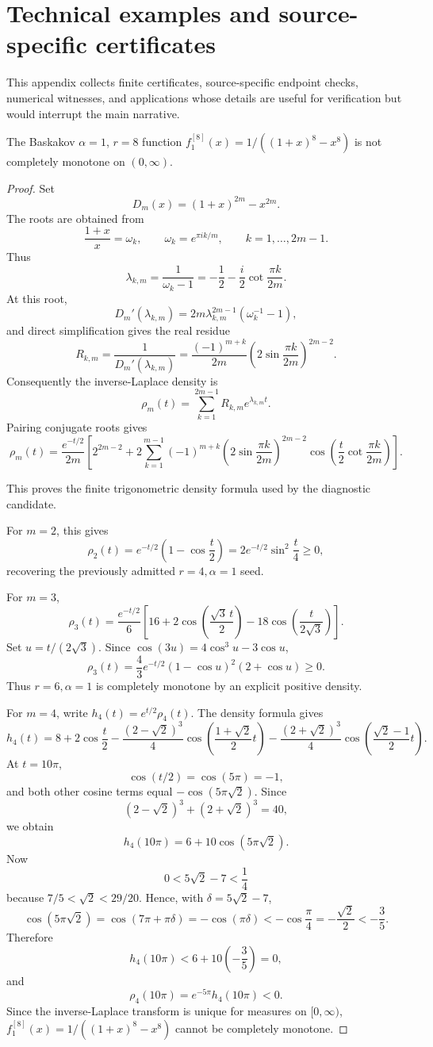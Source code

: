 \section{Technical examples and source-specific certificates}
This appendix collects finite certificates, source-specific endpoint checks, numerical witnesses, and applications whose details are useful for verification but would interrupt the main narrative.
\begin{counterexample}
\label{res:baskakov-alpha1-r8-not-cm}
The Baskakov \(\alpha=1\), \(r=8\) function \(f^{[8]}_1(x)=1/((1+x)^8-x^8)\) is not completely monotone on \((0,\infty)\).
\end{counterexample}
\begin{proof}
Set
\[
D_m(x)=(1+x)^{2m}-x^{2m}.
\]
The roots are obtained from
\[
\frac{1+x}{x}=\omega_k,\qquad
\omega_k=e^{\pi i k/m},\qquad k=1,\ldots,2m-1.
\]
Thus
\[
\lambda_{k,m}
=\frac{1}{\omega_k-1}
=-\frac12-\frac{i}{2}\cot\frac{\pi k}{2m}.
\]
At this root,
\[
D_m'(\lambda_{k,m})
=2m\lambda_{k,m}^{2m-1}(\omega_k^{-1}-1),
\]
and direct simplification gives the real residue
\[
R_{k,m}
=\frac{1}{D_m'(\lambda_{k,m})}
=\frac{(-1)^{m+k}}{2m}
\left(2\sin\frac{\pi k}{2m}\right)^{2m-2}.
\]
Consequently the inverse-Laplace density is
\[
\rho_m(t)
=\sum_{k=1}^{2m-1}R_{k,m}e^{\lambda_{k,m}t}.
\]
Pairing conjugate roots gives
\[
\rho_m(t)
=\frac{e^{-t/2}}{2m}
\left[
2^{2m-2}
+2\sum_{k=1}^{m-1}
(-1)^{m+k}
\left(2\sin\frac{\pi k}{2m}\right)^{2m-2}
\cos\!\left(
\frac{t}{2}\cot\frac{\pi k}{2m}
\right)
\right].
\]

This proves the finite trigonometric density formula used by the diagnostic
candidate.

For \(m=2\), this gives
\[
\rho_2(t)=e^{-t/2}\left(1-\cos\frac t2\right)
=2e^{-t/2}\sin^2\frac t4\ge0,
\]
recovering the previously admitted \(r=4,\alpha=1\) seed.

For \(m=3\),
\[
\rho_3(t)
=\frac{e^{-t/2}}6
\left[
16+2\cos\left(\frac{\sqrt3\,t}{2}\right)
-18\cos\left(\frac{t}{2\sqrt3}\right)
\right].
\]
Set \(u=t/(2\sqrt3)\).  Since
\(\cos(3u)=4\cos^3u-3\cos u\),
\[
\rho_3(t)
=\frac{4}{3}e^{-t/2}(1-\cos u)^2(2+\cos u)\ge0.
\]
Thus \(r=6,\alpha=1\) is completely monotone by an explicit positive density.

For \(m=4\), write \(h_4(t)=e^{t/2}\rho_4(t)\).  The density formula gives
\[
h_4(t)
=8+2\cos\frac t2
-\frac{(2-\sqrt2)^3}{4}
\cos\left(\frac{1+\sqrt2}{2}t\right)
-\frac{(2+\sqrt2)^3}{4}
\cos\left(\frac{\sqrt2-1}{2}t\right).
\]
At \(t=10\pi\),
\[
\cos(t/2)=\cos(5\pi)=-1,
\]
and both other cosine terms equal \(-\cos(5\pi\sqrt2)\).  Since
\[
(2-\sqrt2)^3+(2+\sqrt2)^3=40,
\]
we obtain
\[
h_4(10\pi)=6+10\cos(5\pi\sqrt2).
\]
Now
\[
0<5\sqrt2-7<\frac14
\]
because \(7/5<\sqrt2<29/20\).  Hence, with
\(\delta=5\sqrt2-7\),
\[
\cos(5\pi\sqrt2)=\cos(7\pi+\pi\delta)=-\cos(\pi\delta)
<-\cos\frac\pi4=-\frac{\sqrt2}{2}<-\frac35.
\]
Therefore
\[
h_4(10\pi)<6+10\left(-\frac35\right)=0,
\]
and
\[
\rho_4(10\pi)=e^{-5\pi}h_4(10\pi)<0.
\]
Since the inverse-Laplace transform is unique for measures on
\([0,\infty)\), \(f^{[8]}_1(x)=1/((1+x)^8-x^8)\) cannot be completely monotone.
\end{proof}

